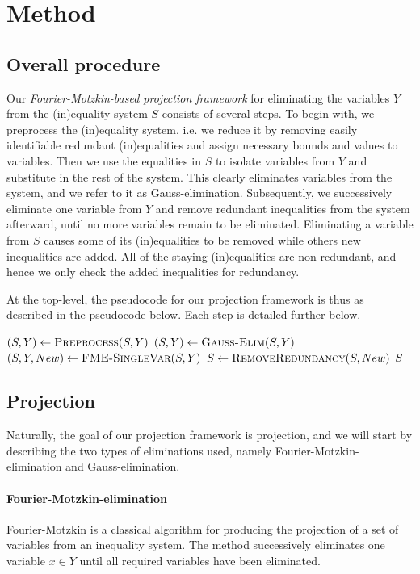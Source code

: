 

\section{Method}
\subsection*{Overall procedure}
Our \emph{Fourier-Motzkin-based projection framework} for eliminating the variables $Y$ from the (in)equality system $S$ consists of several steps. 
%
To begin with, we preprocess the (in)equality system, i.e. we reduce it by removing easily identifiable redundant (in)equalities and assign necessary bounds and values to variables.
Then we use the equalities in $S$ to isolate variables from $Y$ and substitute in the rest of the system. This clearly eliminates variables from the system, and we refer to it as Gauss-elimination.  
Subsequently, we successively eliminate one variable from $Y$ and remove redundant inequalities from the system afterward, until no more variables remain to be eliminated. Eliminating a variable from $S$ causes some of its (in)equalities to be removed while others new inequalities are added. All of the {staying} (in)equalities are non-redundant, and hence we only check the added inequalities for redundancy. 

At the top-level, the pseudocode for our projection framework is thus as described in the pseudocode below. Each step is detailed further below.

\begin{center}
\begin{algorithmic}
	\State $(S,Y)\gets \Call{Preprocess}{S,Y}$
	\State $(S,Y)\gets\Call{Gauss-Elim}{S,Y}$
		\State $(S, Y, New )\gets\Call{FME-SingleVar}{S,Y}$
		\State $S\gets\Call{RemoveRedundancy}{S,New}$
	\EndWhile
	\State \Return $S$
\EndFunction
\end{algorithmic}
\end{center}

\subsection*{Projection}
Naturally, the goal of our projection framework is projection, and we will start by describing the two types of eliminations used, namely Fourier-Motzkin-elimination and Gauss-elimination. 
\paragraph{Fourier-Motzkin-elimination}
Fourier-Motzkin is a classical algorithm for producing the projection of a set of variables from an {in}equality system.
The method successively eliminates one variable $x\in Y$ until all required variables have been eliminated.  

